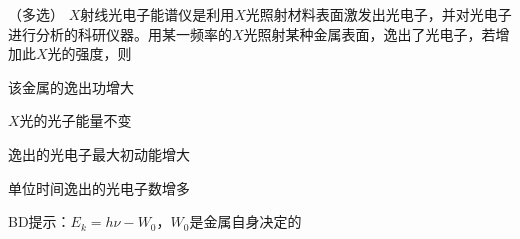 （多选）
\(X\)射线光电子能谱仪是利用\(X\)光照射材料表面激发出光电子，并对光电子进行分析的科研仪器。用某一频率的\(X\)光照射某种金属表面，逸出了光电子，若增加此\(X\)光的强度，则\paren[BD]
\begin{choices}
	\item 该金属的逸出功增大
	\item \(X\)光的光子能量不变
	\item 逸出的光电子最大初动能增大
	\item 单位时间逸出的光电子数增多
\end{choices}
\begin{answer}
	BD\qquad 提示：\(E_k = h\nu - W_0\)，\(W_0\)是金属自身决定的
\end{answer}